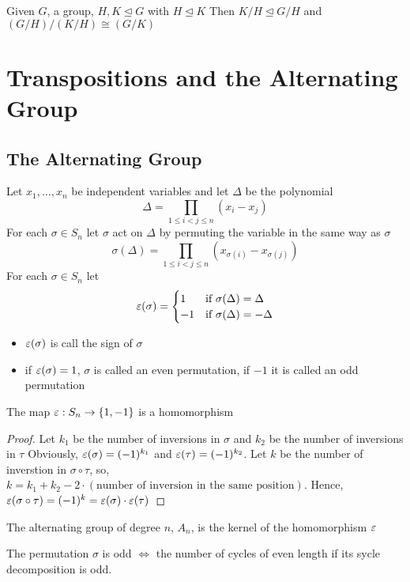 \begin{theorem}
  Given $G$, a group, $H, K \unlhd G$ with $H \unlhd K$ Then
  $K/H \unlhd G/H$ and $(G/H)/(K/H) \cong(G/K)$
\end{theorem}

\section{Transpositions and the Alternating Group}
\subsection{The Alternating Group}
 Let $x_1, \dotsc, x_n$ be independent variables and let $\Delta$ be the polynomial
  \[\Delta = \prod_{1 \le i < j \le n}(x_i - x_j)\]
  For each $\sigma \in S_n$ let $\sigma$ act on $\Delta$ by permuting the variable in the same way as $\sigma$
  \[\sigma(\Delta) = \prod_{1 \le i < j \le n}(x_{\sigma(i)} - x_{\sigma(j)})\]
  For each $\sigma \in S_n$ let 
  \[\varepsilon(\sigma) = \begin{cases}
    1 & \text{if } \sigma(\Delta) = \Delta \\
    -1 & \text{if } \sigma(\Delta) = -\Delta 
  \end{cases}\]
  
\begin{definition}
  \text{ }
  \begin{itemize}
    \item $\varepsilon(\sigma)$ is call the sign of $\sigma$
    \item if $\varepsilon(\sigma) = 1$, $\sigma$ is called an even permutation, if $-1$ it is called an odd permutation
  \end{itemize}
\end{definition}

\begin{proposition}
  The map $\varepsilon: S_n \to \{1, -1\}$ is a homomorphism
\end{proposition}

\begin{proof}
  Let $k_1$ be the number of inversions in $\sigma$ and $k_2$ be the number of inversions in $\tau$
  Obviously, $\varepsilon(\sigma) = (-1)^{k_1}$ and $\varepsilon(\tau) = (-1)^{k_2}$.
  Let $k$ be the number of inverstion in $\sigma \circ \tau$, so, $k = k_1 + k_2 - 2\cdot (\text{number of inversion in the same position})$.
  Hence, $\varepsilon(\sigma \circ \tau) = (-1)^{k} = \varepsilon(\sigma) \cdot \varepsilon(\tau)$
\end{proof}
\begin{definition}
  The alternating group of degree $n$, $A_n$, is the kernel of the homomorphism $\varepsilon$
\end{definition}

\begin{proposition}
  The permutation $\sigma$ is odd $\iff$ the number of cycles of even length if its sycle decomposition is odd.
\end{proposition}